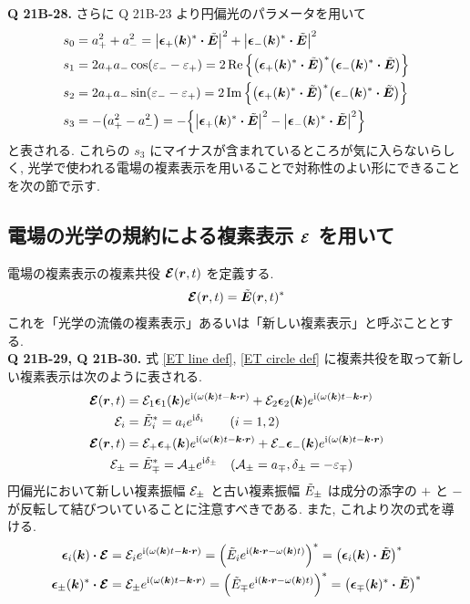 \documentclass[uplatex,a4paper,dvipdfmx]{jsarticle}
\theoremstyle{definition}
\begin{document}
\textbf{Q 21B-28.}
さらに Q 21B-23 より円偏光のパラメータを用いて
\begin{align}
  s_0 & = a_+^2 + a_-^2 = \qty|\ee_+(\kk)^*\vdot\ET|^2 + \qty|\ee_-(\kk)^*\vdot\ET|^2                                   \\
  s_1 & = 2a_+a_-\cos(\varepsilon_- - \varepsilon_+) = 2\Re\qty{\qty(\ee_+(\kk)^*\vdot\ET)^*\qty(\ee_-(\kk)^*\vdot\ET)} \\
  s_2 & = 2a_+a_-\sin(\varepsilon_- - \varepsilon_+) = 2\Im\qty{\qty(\ee_+(\kk)^*\vdot\ET)^*\qty(\ee_-(\kk)^*\vdot\ET)} \\
  s_3 & = -\qty(a_+^2 - a_-^2) = -\qty{\qty|\ee_+(\kk)^*\vdot\ET|^2 - \qty|\ee_-(\kk)^*\vdot\ET|^2}
\end{align}
と表される. これらの $s_3$ にマイナスが含まれているところが気に入らないらしく, 光学で使われる電場の複素表示を用いることで対称性のよい形にできることを次の節で示す. \\

\subsection{電場の光学の規約による複素表示 $\vb*{\mathcal{E}}$ を用いて}
電場の複素表示の複素共役 $\vb*{\mathcal{E}}(\vb*{r}, t)$ を定義する.
\begin{align}
  \vb*{\mathcal{E}}(\vb*{r}, t) = \tilde{\vb*{E}}(\vb*{r}, t)^*
\end{align}
これを「光学の流儀の複素表示」あるいは「新しい複素表示」と呼ぶこととする. \\

\textbf{Q 21B-29, Q 21B-30.}
式 \eqref{ET line def}, \eqref{ET circle def} に複素共役を取って新しい複素表示は次のように表される.
\begin{align}
  \EC(\rr, t) & = \Ec_1\ee_1(\kk)e^{\ii(\omega(\kk)t - \kk\vdot\rr)} + \Ec_2\ee_2(\kk)e^{\ii(\omega(\kk)t - \kk\vdot\rr)}      \\
  \Ec_i       & = \Et_i^* = a_ie^{\ii\delta_i} \qquad (i = 1, 2)                                                               \\
  \EC(\rr, t) & = \Ec_+\ee_+(\kk)e^{\ii(\omega(\kk)t - \kk\vdot\rr)} + \Ec_-\ee_-(\kk)e^{\ii(\omega(\kk)t - \kk\vdot\rr)}      \\
  \Ec_\pm     & = \Et_\mp^* = \mathcal{A}_\pm e^{\ii\delta_\pm} \quad (\mathcal{A}_\pm = a_\mp, \delta_\pm = -\varepsilon_\mp)
\end{align}
円偏光において新しい複素振幅 $\mathcal{E}_\pm$ と古い複素振幅 $\tilde{E}_\pm$ は成分の添字の $+$ と $-$ が反転して結びついていることに注意すべきである. また, これより次の式を導ける.
\begin{align}
  \ee_i(\kk)\vdot\EC
   & = \Ec_ie^{\ii(\omega(\kk)t - \kk\vdot\rr)} = \qty(\Et_i e^{\ii(\kk\vdot\rr - \omega(\kk)t)})^* = \qty(\ee_i(\kk)\vdot\ET)^* \label{EC ET converter 12}          \\
  \ee_\pm(\kk)^*\vdot\EC
   & = \Ec_\pm e^{\ii(\omega(\kk)t - \kk\vdot\rr)} = \qty(\Et_\mp e^{\ii(\kk\vdot\rr - \omega(\kk)t)})^* = \qty(\ee_\mp(\kk)^*\vdot\ET)^* \label{EC ET converter +-}
\end{align}
\\
\end{document}
